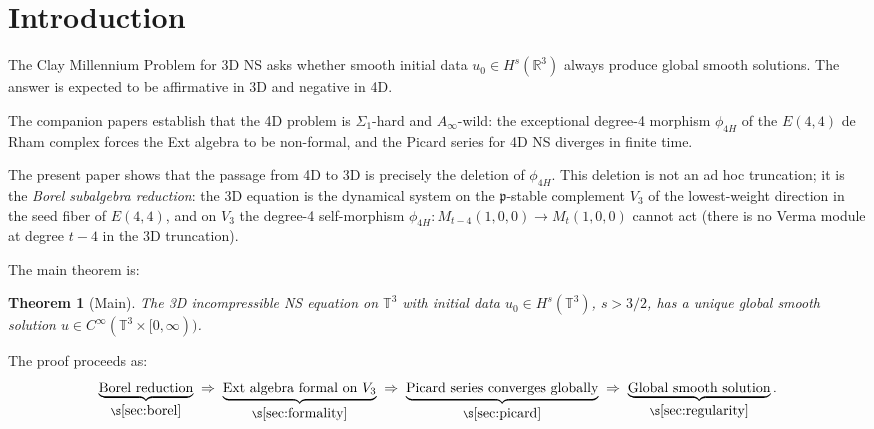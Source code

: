 \documentclass[reqno,10pt]{amsart}
\theoremstyle{plain}
\newtheorem{theorem}{Theorem}[section]
\theoremstyle{definition}
\def\RR{{\mathbb{R}}}
\def\pfrak{\mathfrak{p}}
\begin{document}
\maketitle
\tableofcontents

\section{Introduction}

The Clay Millennium Problem for 3D NS asks whether smooth initial data
$u_0 \in H^s(\RR^3)$ always produce global smooth solutions.  The answer
is expected to be affirmative in 3D and negative in 4D.

The companion papers \cite{Paper1,Paper2} establish that the 4D problem is
$\Sigma_1$-hard and $A_\infty$-wild: the exceptional degree-4 morphism
$\phi_{4H}$ of the $E(4,4)$ de Rham complex forces the Ext algebra to be
non-formal, and the Picard series for 4D NS diverges in finite time.

The present paper shows that the passage from 4D to 3D is precisely the
deletion of $\phi_{4H}$.  This deletion is not an ad hoc truncation; it is
the \emph{Borel subalgebra reduction}: the 3D equation is the dynamical
system on the $\pfrak$-stable complement $V_3$ of the lowest-weight
direction in the seed fiber of $E(4,4)$, and on $V_3$ the degree-4
self-morphism $\phi_{4H}: M_{t-4}(1,0,0) \to M_t(1,0,0)$ cannot act
(there is no Verma module at degree $t-4$ in the 3D truncation).

The main theorem is:

\begin{theorem}[Main]\label{thm:main}
  The 3D incompressible NS equation on $\mathbb{T}^3$ with initial data
  $u_0 \in H^s(\mathbb{T}^3)$, $s > 3/2$, has a unique global smooth
  solution $u \in C^\infty(\mathbb{T}^3 \times [0,\infty))$.
\end{theorem}

The proof proceeds as:
\[
  \underbrace{\text{Borel reduction}}_{\S\ref{sec:borel}}
  \;\Rightarrow\;
  \underbrace{\text{Ext algebra formal on }V_3}_{\S\ref{sec:formality}}
  \;\Rightarrow\;
  \underbrace{\text{Picard series converges globally}}_{\S\ref{sec:picard}}
  \;\Rightarrow\;
  \underbrace{\text{Global smooth solution}}_{\S\ref{sec:regularity}}.
\]

\end{document}
